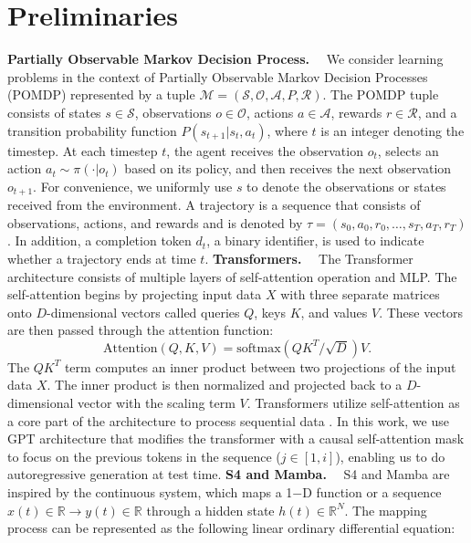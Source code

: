 \documentclass{article}
\begin{document}
\section{Preliminaries}
\noindent\textbf{Partially Observable Markov Decision Process.}~~
We consider learning problems in the context of Partially Observable Markov Decision Processes (POMDP) represented by a tuple $\mathcal{M}=(\mathcal{S,O,A},P, \mathcal{R})$. The POMDP tuple consists of states $s\in \mathcal{S} $, observations $o\in \mathcal{O} $, actions $a\in \mathcal{A} $, rewards $r\in \mathcal{R} $, and a transition probability function $P (s_{t+1}|s_t,a_t)$, where $t$ is an integer denoting the timestep. At each timestep $t$, the agent receives the observation $o_t$, selects an action $a_t \sim \pi(\cdot|o_t)$ based on its policy, and then receives the next observation $o_{t+1}$. For convenience, we uniformly use $s$ to denote the observations or states received from the environment.
A trajectory is a sequence that consists of observations, actions, and rewards and is denoted by $\tau=(s_0,a_0,r_0,\dots,s_T,a_T,r_T)$.
In addition, a completion token $d_t$, a binary identifier, is used to indicate whether a trajectory ends at time $t$.
\noindent\textbf{Transformers.}~~
The Transformer \cite{4} architecture consists of multiple layers of self-attention operation and MLP. The self-attention begins by projecting input data $X$ with three separate matrices onto $D$-dimensional vectors called queries $Q$, keys $K$, and values $V$. These vectors are then passed through the attention function:
\begin{equation}
    \mathrm{Attention}(Q,K,V)=\mathrm{softmax}(QK^T/\sqrt{D})V.
\label{self-attention}
\end{equation}
The $QK^T$ term computes an inner product between two projections of the input data $X$. The inner product is then normalized and projected back to a $D$-dimensional vector with the scaling term $V$. Transformers utilize self-attention as a core part of the architecture to process sequential data \cite{21,22}. In this work, we use GPT \cite{23} architecture that modifies the transformer with a causal self-attention mask to focus on the previous tokens in the sequence ($j\in[1,i]$), enabling us to do autoregressive generation at test time.
\noindent\textbf{S4 and Mamba.}~~
S4 \cite{12} and Mamba \cite{10} are inspired by the continuous system, which maps a 1$-$D function or a sequence $x(t)\in \mathbb{R}\rightarrow y(t)\in \mathbb{R}$ through a hidden state $h(t)\in \mathbb{R}^N$. The mapping process can be represented as the following linear ordinary differential equation:
\end{document}
